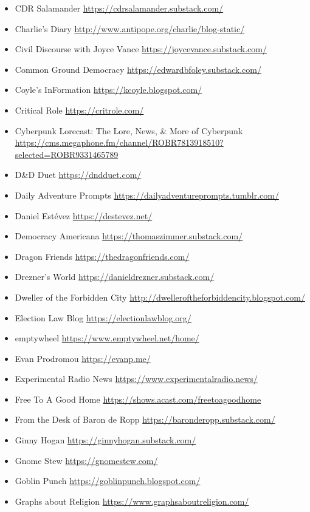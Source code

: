 \begin{itemize}
\item
  CDR Salamander \url{https://cdrsalamander.substack.com/}
\item
  Charlie's Diary \url{http://www.antipope.org/charlie/blog-static/}
\item
  Civil Discourse with Joyce Vance
  \url{https://joycevance.substack.com/}
\item
  Common Ground Democracy \url{https://edwardbfoley.substack.com/}
\item
  Coyle's InFormation \url{https://kcoyle.blogspot.com/}
\item
  Critical Role \url{https://critrole.com/}
\item
  Cyberpunk Lorecast: The Lore, News, \& More of Cyberpunk
  \url{https://cms.megaphone.fm/channel/ROBR7813918510?selected=ROBR9331465789}
\item
  D\&D Duet \url{https://dndduet.com/}
\item
  Daily Adventure Prompts
  \url{https://dailyadventureprompts.tumblr.com/}
\item
  Daniel Estévez \url{https://destevez.net/}
\item
  Democracy Americana \url{https://thomaszimmer.substack.com/}
\item
  Dragon Friends \url{https://thedragonfriends.com/}
\item
  Drezner's World \url{https://danieldrezner.substack.com/}
\item
  Dweller of the Forbidden City
  \url{http://dwelleroftheforbiddencity.blogspot.com/}
\item
  Election Law Blog \url{https://electionlawblog.org/}
\item
  emptywheel \url{https://www.emptywheel.net/home/}
\item
  Evan Prodromou \url{https://evanp.me/}
\item
  Experimental Radio News \url{https://www.experimentalradio.news/}
\item
  Free To A Good Home \url{https://shows.acast.com/freetoagoodhome}
\item
  From the Desk of Baron de Ropp \url{https://baronderopp.substack.com/}
\item
  Ginny Hogan \url{https://ginnyhogan.substack.com/}
\item
  Gnome Stew \url{https://gnomestew.com/}
\item
  Goblin Punch \url{https://goblinpunch.blogspot.com/}
\item
  Graphs about Religion \url{https://www.graphsaboutreligion.com/}

\end{itemize}
